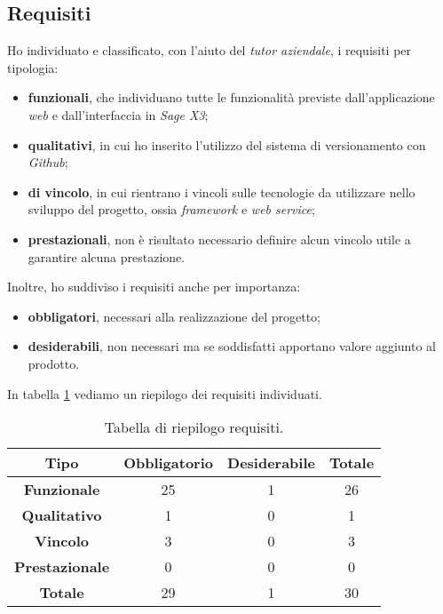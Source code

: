 \subsection{Requisiti}
Ho individuato e classificato, con l'aiuto del \textit{tutor aziendale}, i requisiti per tipologia:
\begin{itemize}
	\item \textbf{funzionali}, che individuano tutte le funzionalità previste dall'applicazione \textit{web} e dall'interfaccia in \textit{Sage X3};
	\item \textbf{qualitativi}, in cui ho inserito l'utilizzo del sistema di versionamento con \textit{Github};
	\item \textbf{di vincolo}, in cui rientrano i vincoli sulle tecnologie da utilizzare nello sviluppo del progetto, ossia \textit{framework} e \textit{web service}; 
	\item \textbf{prestazionali}, non è risultato necessario definire alcun vincolo utile a garantire alcuna prestazione.
\end{itemize}
Inoltre, ho suddiviso i requisiti anche per importanza:
\begin{itemize}
	\item \textbf{obbligatori}, necessari alla realizzazione del progetto;
	\item \textbf{desiderabili}, non necessari ma se soddisfatti apportano valore aggiunto al prodotto.
\end{itemize}
In tabella \ref{table:requisiti} vediamo un riepilogo dei requisiti individuati.

\begin{center}
\begin{longtable}{ | c| c | c | c|}
	\caption{Tabella di riepilogo requisiti.}
	\label{table:requisiti}\\
	\hline
	\textbf{Tipo} & \textbf{Obbligatorio} & \textbf{Desiderabile} & \textbf{Totale}\\
	\hline
	\textbf{Funzionale} & 25 & 1 & 26 \\
	\hline
	\textbf{Qualitativo} & 1 & 0 & 1\\
	\hline
	\textbf{Vincolo} & 3 & 0 & 3 \\
	\hline
	\textbf{Prestazionale} & 0 & 0 & 0 \\
	\hline
	\textbf{Totale} & 29 & 1 & 30 \\
	\hline
\end{longtable}
\end{center}

